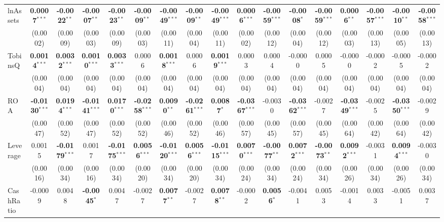 \begin{landscape}
\begin{table}[H]
\begin{tabular}{lcccccccccccccccc}
\midrule
lnAssets & \textbf{0.0007}$^{***}$ & \textbf{-0.0022}$^{**}$ & \textbf{-0.0007}$^{**}$ & \textbf{-0.0023}$^{**}$ & \textbf{-0.0009}$^{**}$ & \textbf{-0.0049}$^{***}$ & \textbf{-0.0009}$^{**}$ & \textbf{-0.0049}$^{***}$ & \textbf{0.0006}$^{***}$ & \textbf{-0.0059}$^{***}$ & \textbf{-0.0008}$^{*}$ & \textbf{-0.0059}$^{***}$ & \textbf{0.0006}$^{**}$ & \textbf{-0.0057}$^{***}$ & \textbf{-0.0010}$^{**}$ & \textbf{-0.0058}$^{***}$ \\
 & (0.0002) & (0.0009) & (0.0003) & (0.0009) & (0.0003) & (0.0011) & (0.0004) & (0.0011) & (0.0002) & (0.0012) & (0.0004) & (0.0012) & (0.0003) & (0.0013) & (0.0005) & (0.0013) \\
TobinsQ & \textbf{0.0014}$^{***}$ & \textbf{0.0032}$^{***}$ & \textbf{0.0010}$^{***}$ & \textbf{0.0033}$^{***}$ & 0.0006 & \textbf{0.0018}$^{***}$ & 0.0006 & \textbf{0.0019}$^{***}$ & 0.0003 & 0.0004 & -0.0000 & 0.0005 & -0.0000 & -0.0002 & -0.0005 & -0.0002 \\
 & (0.0004) & (0.0004) & (0.0004) & (0.0004) & (0.0004) & (0.0004) & (0.0004) & (0.0004) & (0.0004) & (0.0004) & (0.0004) & (0.0004) & (0.0004) & (0.0004) & (0.0004) & (0.0004) \\
ROA & \textbf{-0.0130}$^{***}$ & \textbf{0.0194}$^{***}$ & \textbf{-0.0141}$^{***}$ & \textbf{0.0170}$^{***}$ & \textbf{-0.0258}$^{***}$ & \textbf{0.0090}$^{**}$ & \textbf{-0.0261}$^{***}$ & \textbf{0.0087}$^{*}$ & \textbf{-0.0367}$^{***}$ & -0.0030 & \textbf{-0.0362}$^{***}$ & -0.0027 & \textbf{-0.0349}$^{***}$ & -0.0025 & \textbf{-0.0350}$^{***}$ & -0.0029 \\
 & (0.0047) & (0.0052) & (0.0047) & (0.0052) & (0.0052) & (0.0046) & (0.0052) & (0.0046) & (0.0057) & (0.0045) & (0.0057) & (0.0045) & (0.0064) & (0.0042) & (0.0064) & (0.0042) \\
Leverage & 0.0015 & \textbf{-0.0179}$^{***}$ & 0.0017 & \textbf{-0.0175}$^{***}$ & \textbf{0.0056}$^{***}$ & \textbf{-0.0120}$^{***}$ & \textbf{0.0056}$^{***}$ & \textbf{-0.0115}$^{***}$ & \textbf{0.0070}$^{***}$ & \textbf{-0.0077}$^{**}$ & \textbf{0.0072}$^{***}$ & \textbf{-0.0073}$^{**}$ & \textbf{0.0092}$^{***}$ & -0.0031 & \textbf{0.0094}$^{***}$ & -0.0030 \\
 & (0.0016) & (0.0034) & (0.0016) & (0.0034) & (0.0020) & (0.0034) & (0.0020) & (0.0034) & (0.0024) & (0.0034) & (0.0024) & (0.0034) & (0.0026) & (0.0034) & (0.0026) & (0.0034) \\
CashRatio & -0.0009 & 0.0048 & \textbf{-0.0045}$^{*}$ & 0.0047 & -0.0027 & \textbf{0.0077}$^{**}$ & -0.0027 & \textbf{0.0078}$^{**}$ & -0.0002 & \textbf{0.0056}$^{*}$ & -0.0041 & 0.0053 & -0.0014 & 0.0033 & -0.0051 & 0.0037 \\

\end{tabular}
\end{table}
\end{landscape}
